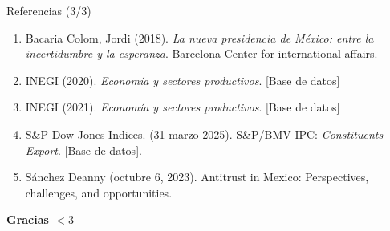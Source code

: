 \documentclass[aspectratio=169,xcolor=dvipsnames]{beamer}
\begin{document}
\begin{frame}{Referencias (3/3)}
    \begin{enumerate}
        \item 
        Bacaria Colom, Jordi (2018). \textit{La nueva presidencia de México: entre la incertidumbre y la esperanza}. Barcelona Center for international affairs.
        \item 
        INEGI (2020). \textit{Economía y sectores productivos}. [Base de datos]
        \item 
        INEGI (2021). \textit{Economía y sectores productivos}. [Base de datos]
        \item
        S\&P Dow Jones Indices. (31 marzo 2025). S\&P/BMV IPC: \emph{Constituents Export}. {[}Base de datos{]}.
        \item
        Sánchez Deanny (octubre 6, 2023). Antitrust in Mexico: Perspectives,
        challenges, and opportunities.
    \end{enumerate}
\end{frame}

\begin{frame}
    \Huge{\centerline{\textbf{Gracias $<3$}}}
\end{frame}

\end{document}
